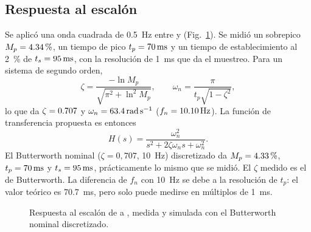 \subsection{Respuesta al escalón}
Se aplicó una onda cuadrada de \SI{0,5}{\hertz} entre \val{\resEscBajo}{\volt} y \val{\resEscAlto}{\volt} (Fig.~\ref{fig:escalon}). Se midió un sobrepico $M_p = \val{\resMp}{\percent}$, un tiempo de pico $t_p = \val{\resTp}{\milli\second}$ y un tiempo de establecimiento al \SI{2}{\percent} de $t_s = \val{\resTs}{\milli\second}$, con la resolución de \SI{1}{\milli\second} que da el muestreo. Para un sistema de segundo orden,
\begin{equation}
\zeta = \frac{-\ln M_p}{\sqrt{\pi^2 + \ln^2 M_p}}, \qquad \omega_n = \frac{\pi}{t_p\sqrt{1 - \zeta^2}},
\label{eq:zetawn}
\end{equation}
lo que da $\zeta = \nm{\resZeta}$ y $\omega_n = \val{\resWn}{\radian\per\second}$ ($f_n = \val{\resFn}{\hertz}$). La función de transferencia propuesta es entonces
\begin{equation}
H(s) = \frac{\omega_n^2}{s^2 + 2\zeta\omega_n s + \omega_n^2}.
\label{eq:hs}
\end{equation}
El Butterworth nominal ($\zeta = 0{,}707$, \SI{10}{\hertz}) discretizado da $M_p = \SI{\resMpSim}{\percent}$, $t_p = \SI{70}{\milli\second}$ y $t_s = \SI{95}{\milli\second}$, prácticamente lo mismo que se midió. El $\zeta$ medido es el de Butterworth. La diferencia de $f_n$ con \SI{10}{\hertz} se debe a la resolución de $t_p$: el valor teórico es \SI{70,7}{\milli\second}, pero solo puede medirse en múltiplos de \SI{1}{\milli\second}.

\begin{figure}[!htb]
\centering
{}
\caption{Respuesta al escalón de \protect\val{\resEscBajo}{\volt} a \protect\val{\resEscAlto}{\volt}, medida y simulada con el Butterworth nominal discretizado.}
\label{fig:escalon}
\end{figure}

